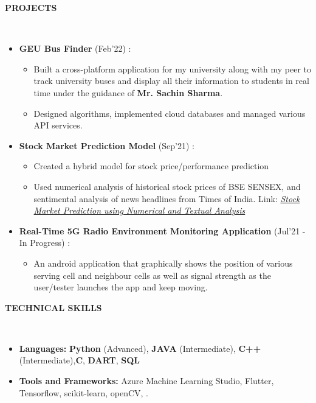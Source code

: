 \documentclass[a4paper,10pt]{article}
\newcommand{\lsep}{-0.5cm}
\newcommand{\resheading}[1]{{\small \colorbox{mygrey}{\begin{minipage}{0.975\textwidth}{\textbf{#1 \vphantom{p\^{E}}}}\end{minipage}}}}
\begin{document}
\resheading{\textbf{PROJECTS} }\\[\lsep]
\begin{itemize}
\setlength\itemsep{0.0em}

\item \textbf{GEU Bus Finder} (Feb'22) : 
\begin{itemize}
\setlength\itemsep{0.1em}
\item Built a cross-platform application for my university along with my peer to track university buses and display all their information to students in real time under the guidance of \textbf{Mr. Sachin Sharma}.
\item Designed algorithms, implemented cloud databases and managed various API services.
\end{itemize}

\item \textbf{Stock Market Prediction Model} (Sep'21) : 
\begin{itemize}
\setlength\itemsep{0.1em}
\item Created a hybrid model for stock price/performance prediction
\item Used numerical analysis of historical stock prices of BSE SENSEX, and sentimental analysis of news headlines from Times of India. Link: \href{https://github.com/Ash20vyas/TSF-Intern-Tasks/tree/main/%232%20-%20Stock%20Market%20Prediction%20using%20Numerical%20and%20Textual%20Analysis} {\textit{Stock Market Prediction using Numerical and Textual Analysis}}
\end{itemize}

\item \textbf{Real-Time 5G Radio Environment Monitoring Application} (Jul'21 - In Progress) : 
\begin{itemize}
\setlength\itemsep{0.1em}
\item An android application that graphically shows the position of various serving cell and neighbour cells as well as signal strength as the user/tester launches the app and keep moving.
\end{itemize}

\end{itemize}

\resheading{\textbf{TECHNICAL SKILLS} }\\[\lsep]
\begin{itemize}
\setlength\itemsep{0.1em}
\item \noindent \textbf{Languages:} \textbf{Python} (Advanced), \textbf{JAVA} (Intermediate), \textbf{C++} (Intermediate),\textbf{C},  \textbf{DART}, \textbf{SQL} \\
\item \noindent\textbf{Tools and Frameworks:} Azure Machine Learning Studio, Flutter, Tensorflow, scikit-learn, openCV, .\\
\end{itemize}
\end{document}
